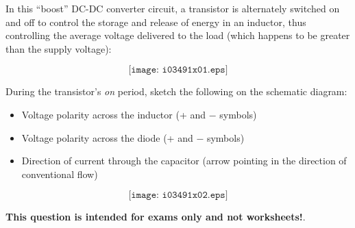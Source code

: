 

In this ``boost'' DC-DC converter circuit, a transistor is alternately switched on and off to control the storage and release of energy in an inductor, thus controlling the average voltage delivered to the load (which happens to be greater than the supply voltage):

$$\texttt{[image: i03491x01.eps]}$$

During the transistor's {\it on} period, sketch the following on the schematic diagram:

\begin{itemize}
\item{} Voltage polarity across the inductor (+ and $-$ symbols)
\vskip 5pt
\item{} Voltage polarity across the diode (+ and $-$ symbols)
\vskip 5pt
\item{} Direction of current through the capacitor (arrow pointing in the direction of conventional flow)
\end{itemize}







$$\texttt{[image: i03491x02.eps]}$$







{\bf This question is intended for exams only and not worksheets!}.


